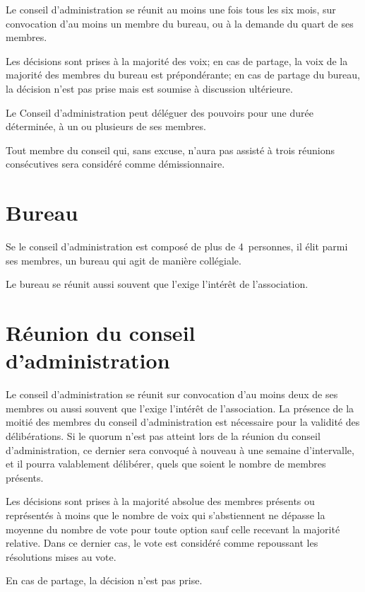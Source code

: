 \documentclass[12 pt]{article}
\begin{document}
Le conseil d’administration se réunit au moins une fois tous les six
mois, sur convocation d’au moins un membre du bureau, ou à la demande
du quart de ses membres.

Les décisions sont prises à la majorité des voix; en cas de partage,
la voix de la majorité des membres du bureau est prépondérante; en cas
de partage du bureau, la décision n’est pas prise mais est soumise à
discussion ultérieure.

Le Conseil d’administration peut déléguer des pouvoirs pour une durée
déterminée, à un ou plusieurs de ses membres.

Tout membre du conseil qui, sans excuse, n’aura pas assisté à trois
réunions consécutives sera considéré comme démissionnaire.

\section{Bureau}
\label{sec:reunion-du-bureau}

Se le conseil d'administration est composé de plus de 4~personnes, il
élit parmi ses membres, un bureau qui agit de manière collégiale.

Le bureau se réunit aussi souvent que l'exige l'intérêt de
l'association.

\section{Réunion du conseil d'administration}
\label{sec:reunion-du-conseil-d-administration}

Le conseil d'administration se réunit sur convocation d'au moins deux
de ses membres ou aussi souvent que l'exige l'intérêt de
l'association. La présence de la moitié des membres du conseil
d'administration est nécessaire pour la validité des délibérations. Si
le quorum n'est pas atteint lors de la réunion du conseil
d'administration, ce dernier sera convoqué à nouveau à une semaine
d'intervalle, et il pourra valablement délibérer, quels que soient le
nombre de membres présents.

Les décisions sont prises à la majorité absolue des membres présents
ou représentés à moins que le nombre de voix qui s'abstiennent ne dépasse
la moyenne du nombre de vote pour toute option sauf celle recevant la
majorité relative.  Dans ce dernier cas, le vote est considéré comme
repoussant les résolutions mises au vote.

En cas de partage, la décision n'est pas prise.
\end{document}
